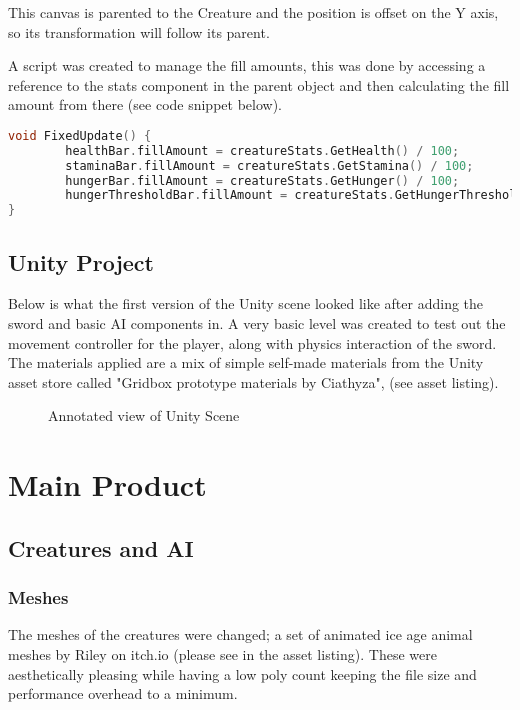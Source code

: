\documentclass[11pt]{report}
\begin{document}
This canvas is parented to the Creature and the position is offset on the Y axis, so its transformation will follow its parent.

A script was created to manage the fill amounts, this was done by accessing a reference to the stats component in the parent object and then calculating the fill amount from there (see code snippet below).

\begin{lstlisting}[language=c]
void FixedUpdate() {
        healthBar.fillAmount = creatureStats.GetHealth() / 100;
        staminaBar.fillAmount = creatureStats.GetStamina() / 100;
        hungerBar.fillAmount = creatureStats.GetHunger() / 100;
        hungerThresholdBar.fillAmount = creatureStats.GetHungerThreshold() / 100;
}
\end{lstlisting}

\subsection{Unity Project}

Below is what the first version of the Unity scene looked like after adding the sword and basic AI components in. A very basic level was created to test out the movement controller for the player, along with physics interaction of the sword. The materials applied are a mix of simple self-made materials from the Unity asset store called "Gridbox prototype materials by Ciathyza", (see asset listing).

\begin{figure}[H]
    \centering
    \caption{Annotated view of Unity Scene}
\end{figure}



\section{Main Product}
\subsection{Creatures and AI}
\subsubsection{Meshes}
The meshes of the creatures were changed; a set of animated ice age animal meshes by Riley on itch.io (please see in the asset listing). These were aesthetically pleasing while having a low poly count keeping the file size and performance overhead to a minimum. 
\end{document}
